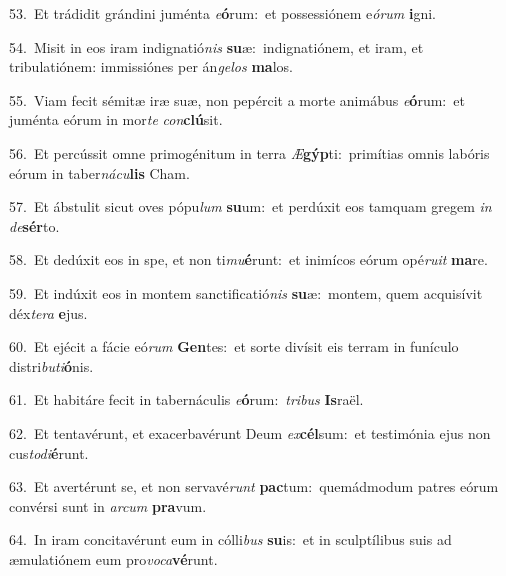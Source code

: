 {\numbfont\textcolor{\numbcolor}{53.}}~Et trádidit grándini juménta \textit{e}\-\textbf{ó}rum:~\star et possessiónem e\-\textit{ó}\-\textit{rum} \textbf{i}\-gni.\par
{\numbfont\textcolor{\numbcolor}{54.}}~Misit in eos iram indignatió\textit{nis} \textbf{su}\-æ:~\star indignatiónem, et iram, et tribulatiónem: immissiónes per án\-\textit{ge}\-\textit{los} \textbf{ma}\-los.\par
{\numbfont\textcolor{\numbcolor}{55.}}~Viam fecit sémitæ iræ suæ, non pepércit a morte animábus \textit{e}\-\textbf{ó}rum:~\star et juménta eórum in mor\textit{te} \textit{con}\-\textbf{clú}sit.\par
{\numbfont\textcolor{\numbcolor}{56.}}~Et percússit omne primogénitum in terra \textit{Æ}\-\textbf{gýp}ti:~\star primítias omnis labóris eórum in taber\-\textit{ná}\-\textit{cu}\textbf{lis} Cham.\par
{\numbfont\textcolor{\numbcolor}{57.}}~Et ábstulit sicut oves pópu\textit{lum} \textbf{su}\-um:~\star et perdúxit eos tamquam gregem \textit{in} \textit{de}\-\textbf{sér}to.\par
{\numbfont\textcolor{\numbcolor}{58.}}~Et dedúxit eos in spe, et non ti\-\textit{mu}\-\textbf{é}runt:~\star et inimícos eórum opé\-\textit{ru}\-\textit{it} \textbf{ma}\-re.\par
{\numbfont\textcolor{\numbcolor}{59.}}~Et indúxit eos in montem sanctificatió\textit{nis} \textbf{su}\-æ:~\star montem, quem acquisívit déx\-\textit{te}\-\textit{ra} \textbf{e}\-jus.\par
{\numbfont\textcolor{\numbcolor}{60.}}~Et ejécit a fácie eó\textit{rum} \textbf{Gen}\-tes:~\star et sorte divísit eis terram in funículo distri\-\textit{bu}\-\textit{ti}\textbf{ó}nis.\par
{\numbfont\textcolor{\numbcolor}{61.}}~Et habitáre fecit in tabernáculis \textit{e}\-\textbf{ó}rum:~\star \textit{tri}\-\textit{bus} \textbf{Is}\-raël.\par
{\numbfont\textcolor{\numbcolor}{62.}}~Et tentavérunt, et exacerbavérunt Deum \textit{ex}\-\textbf{cél}sum:~\star et testimónia ejus non cus\-\textit{to}\-\textit{di}\textbf{é}runt.\par
{\numbfont\textcolor{\numbcolor}{63.}}~Et avertérunt se, et non servavé\textit{runt} \textbf{pac}\-tum:~\star quemádmodum patres eórum convérsi sunt in \textit{ar}\-\textit{cum} \textbf{pra}\-vum.\par
{\numbfont\textcolor{\numbcolor}{64.}}~In iram concitavérunt eum in cólli\textit{bus} \textbf{su}\-is:~\star et in sculptílibus suis ad æmulatiónem eum pro\-\textit{vo}\-\textit{ca}\textbf{vé}runt.\par
